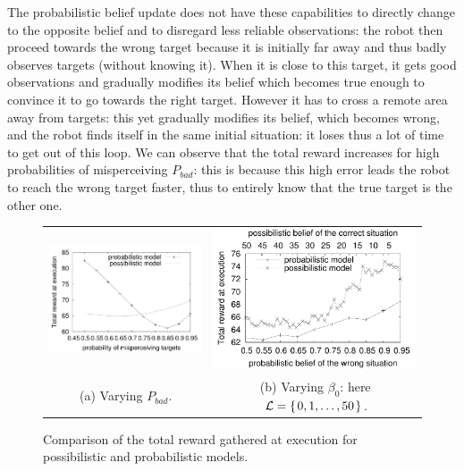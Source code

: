 The probabilistic belief update does not have these capabilities 
to directly change to the opposite belief and to disregard less reliable observations: 
the robot then proceed towards the wrong target because 
it is initially far away and thus badly observes targets
(without knowing it). 
When it is close to this target, 
it gets good observations and gradually modifies its belief 
which becomes true enough to convince it to go towards the right target. 
However it has to cross a remote area away from targets: 
this yet gradually modifies its belief, 
which becomes wrong, 
and the robot finds itself 
in the same initial situation: 
it loses thus a lot of time 
to get out of this loop. 
We can observe that the total reward increases 
for high probabilities of misperceiving $P_{bad}$: 
this is because this high error 
leads the robot to reach 
the wrong target faster, 
thus to entirely know that 
the true target is the other one.
\begin{figure}\centering
\begin{tabular}{cc}
\includegraphics[width=.45\linewidth]{courbe1.pdf} &
\includegraphics[width=.45\linewidth]{courbe2.pdf} \\
(a) Varying $P_{bad}$.  & (b) Varying $\beta_0$: here $\mathcal{L}=\left\{ \left. 0,1,\ldots,50 \right. \right\}$.
\end{tabular}
\caption{Comparison of the total reward gathered at execution for possibilistic and probabilistic models.} \label{figureexp}
\end{figure}


